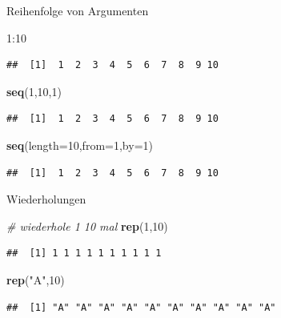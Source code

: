 \documentclass[ignorenonframetext,]{beamer}
\newenvironment{Shaded}{}{}
\newcommand{\KeywordTok}[1]{\textcolor[rgb]{0.00,0.44,0.13}{\textbf{{#1}}}}
\newcommand{\DataTypeTok}[1]{\textcolor[rgb]{0.56,0.13,0.00}{{#1}}}
\newcommand{\DecValTok}[1]{\textcolor[rgb]{0.25,0.63,0.44}{{#1}}}
\newcommand{\StringTok}[1]{\textcolor[rgb]{0.25,0.44,0.63}{{#1}}}
\newcommand{\CommentTok}[1]{\textcolor[rgb]{0.38,0.63,0.69}{\textit{{#1}}}}
\newcommand{\NormalTok}[1]{{#1}}
\begin{document}
\begin{frame}[fragile]{Reihenfolge von Argumenten}

\begin{Shaded}
\begin{Highlighting}[]
\DecValTok{1}\NormalTok{:}\DecValTok{10}
\end{Highlighting}
\end{Shaded}

\begin{verbatim}
##  [1]  1  2  3  4  5  6  7  8  9 10
\end{verbatim}

\begin{Shaded}
\begin{Highlighting}[]
\KeywordTok{seq}\NormalTok{(}\DecValTok{1}\NormalTok{,}\DecValTok{10}\NormalTok{,}\DecValTok{1}\NormalTok{)}
\end{Highlighting}
\end{Shaded}

\begin{verbatim}
##  [1]  1  2  3  4  5  6  7  8  9 10
\end{verbatim}

\begin{Shaded}
\begin{Highlighting}[]
\KeywordTok{seq}\NormalTok{(}\DataTypeTok{length=}\DecValTok{10}\NormalTok{,}\DataTypeTok{from=}\DecValTok{1}\NormalTok{,}\DataTypeTok{by=}\DecValTok{1}\NormalTok{)}
\end{Highlighting}
\end{Shaded}

\begin{verbatim}
##  [1]  1  2  3  4  5  6  7  8  9 10
\end{verbatim}

\end{frame}

\begin{frame}[fragile]{Wiederholungen}

\begin{Shaded}
\begin{Highlighting}[]
\CommentTok{# wiederhole 1 10 mal}
\KeywordTok{rep}\NormalTok{(}\DecValTok{1}\NormalTok{,}\DecValTok{10}\NormalTok{)}
\end{Highlighting}
\end{Shaded}

\begin{verbatim}
##  [1] 1 1 1 1 1 1 1 1 1 1
\end{verbatim}

\begin{Shaded}
\begin{Highlighting}[]
\KeywordTok{rep}\NormalTok{(}\StringTok{"A"}\NormalTok{,}\DecValTok{10}\NormalTok{)}
\end{Highlighting}
\end{Shaded}

\begin{verbatim}
##  [1] "A" "A" "A" "A" "A" "A" "A" "A" "A" "A"
\end{verbatim}

\end{frame}
\end{document}
